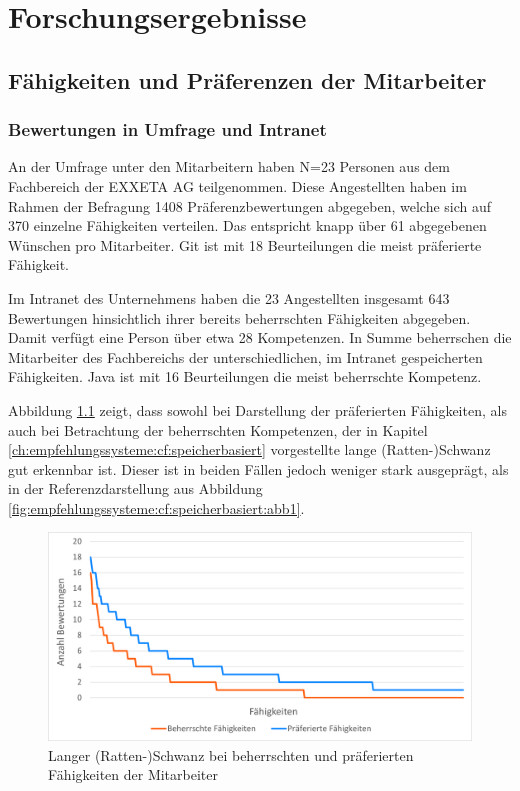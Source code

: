 \chapter{Forschungsergebnisse}
\label{ch:ergebnisse}

\section{Fähigkeiten und Präferenzen der Mitarbeiter}
\label{ch:ergebnisse:analyse}
\subsection{Bewertungen in Umfrage und Intranet}
\label{ch:ergebnisse:analyse:intranetUndUmfrage}
An der Umfrage unter den Mitarbeitern haben N=23 Personen aus dem Fachbereich \JES der EXXETA AG teilgenommen. Diese Angestellten haben im Rahmen der Befragung 1408 Präferenzbewertungen abgegeben, welche sich auf 370 einzelne Fähigkeiten verteilen. Das entspricht knapp über 61 abgegebenen Wünschen pro Mitarbeiter. Git ist mit 18 Beurteilungen die meist präferierte Fähigkeit.

Im Intranet des Unternehmens haben die 23 Angestellten insgesamt 643 Bewertungen hinsichtlich ihrer bereits beherrschten Fähigkeiten abgegeben. Damit verfügt eine Person über etwa 28 Kompetenzen. In Summe beherrschen die Mitarbeiter des Fachbereichs  der \anzFaehigkeiten unterschiedlichen, im Intranet gespeicherten Fähigkeiten. Java ist mit 16 Beurteilungen die meist beherrschte Kompetenz.

Abbildung \ref{fig:ergebnisse:analyse:abb1} zeigt, dass sowohl bei Darstellung der präferierten Fähigkeiten, als auch bei Betrachtung der beherrschten Kompetenzen, der in Kapitel \ref{ch:empfehlungssysteme:cf:speicherbasiert} vorgestellte lange (Ratten-)Schwanz gut erkennbar ist. Dieser ist in beiden Fällen jedoch weniger stark ausgeprägt, als in der Referenzdarstellung aus Abbildung \ref{fig:empfehlungssysteme:cf:speicherbasiert:abb1}.

\begin{figure}[h]
	\centering
	\includegraphics[width=1\textwidth]{gfx/long-tail-insgesamt.png}
	\caption{Langer (Ratten-)Schwanz bei beherrschten und präferierten Fähigkeiten der Mitarbeiter}
	\label{fig:ergebnisse:analyse:abb1}
\end{figure}

